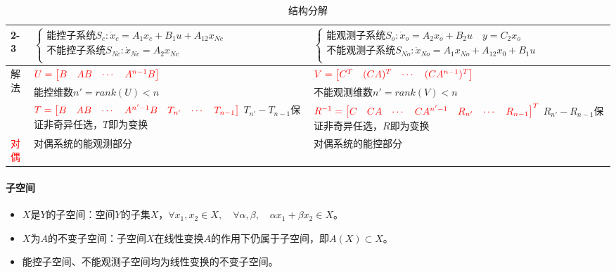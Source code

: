 \documentclass[
12pt, %
a4paper, 
oneside, %
]{scrartcl}
\begin{document}
\begin{table}[H]
\begin{tabular}{|p{1.1cm}|p{7.5cm}|p{8.5cm}|}
\cline{2-3}
 & $ \begin{cases} \text{能控子系统}S_c: \dot{x}_c = A_1 x_c + B_1 u + A_{12} x_{Nc} \\ \text{不能控子系统}S_{Nc}: \dot{x}_{Nc} = A_2 x_{Nc} \\ \end{cases} $ & $ \begin{cases} \text{能观测子系统}S_o: \dot{x}_o = A_2 x_o + B_2 u \quad y = C_2 x_o \\ \text{不能观测子系统}S_{No}: \dot{x}_{No} = A_1 x_{No} + A_{12} x_0 + B_1 u \\ \end{cases} $ \\
\hline
\multirow{3}{*}{解法} & $ \textcolor{red}{U = \begin{bmatrix} B & A B & \cdots & A^{n - 1} B \end{bmatrix}} $ & $ \textcolor{red}{V = \begin{bmatrix} C^T & (C A)^T & \cdots & (C A^{n - 1})^T \end{bmatrix}} $ \\
\cline{2-3}
 & 能控维数$ n' = rank(U) < n $ & 不能观测维数$ n' = rank(V) < n $ \\
\cline{2-3}
 & $ \textcolor{red}{T = \begin{bmatrix} B & AB & \cdots & A^{n' - 1} B & T_{n'} & \cdots & T_{n - 1} \end{bmatrix}} $ \newline $ T_{n'} - T_{n - 1} $保证非奇异任选，$ T $即为变换 & $ \textcolor{red}{R^{-1} = \begin{bmatrix} C & C A & \cdots & C A^{n' - 1} & R_{n'} & \cdots & R_{n - 1} \end{bmatrix}^T} $ \newline $ R_{n'} - R_{n - 1} $保证非奇异任选，$ R $即为变换 \\
\hline
\textcolor{red}{对偶} & 对偶系统的能观测部分 & 对偶系统的能控部分 \\
\hline
\end{tabular}
\caption{结构分解}
\end{table}
\paragraph{子空间}
\begin{itemize}
\item $ X $是$ Y $的子空间：空间$ Y $的子集$ X $，$ \forall x_1, x_2 \in X, \quad \forall \alpha, \beta, \quad \alpha x_1 + \beta x_2 \in X $。
\item $ X $为$ A $的不变子空间：子空间$ X $在线性变换$ A $的作用下仍属于子空间，即$ A(X) \subset X $。
\item 能控子空间、不能观测子空间均为线性变换的不变子空间。
\end{itemize}
\end{document}
